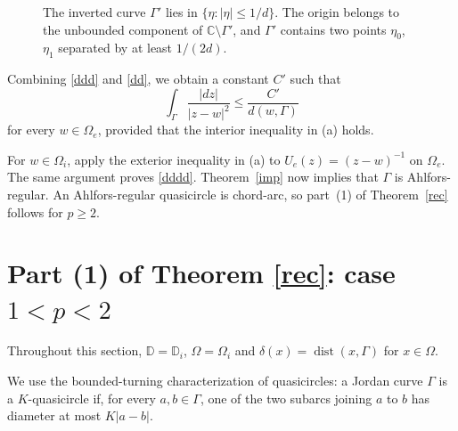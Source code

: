 \documentclass[11pt]{article}
\numberwithin{equation}{section}
\theoremstyle{remark}
\newcommand{\dist}{\operatorname{dist}}
\begin{document}
\begin{figure}[htp]

\caption{
The inverted curve $\Gamma'$ lies in
$\{\eta:|\eta|\le 1/d\}$.
The origin belongs to the unbounded component of
$\mathbb C\setminus\Gamma'$, and $\Gamma'$ contains two points $\eta_0$, $\eta_1$
separated by at least $1/(2d)$.
}
\label{fig:inversion}
\end{figure}
Combining \eqref{ddd} and \eqref{dd}, we obtain a constant $C'$ such
that
\begin{equation}\label{dddd}
    \int_{\Gamma}\frac{|dz|}{|z - w|^2} \leq \frac{C'}{d(w, \Gamma)}
\end{equation}
for every $w\in\Omega_e$, provided that the interior inequality in
\rm(a) holds.

For $w\in\Omega_i$, apply the exterior inequality in \rm(a) to
$U_e(z)=(z-w)^{-1}$ on $\Omega_e$.  The same argument proves
\eqref{dddd}.  Theorem~\ref{imp} now implies that $\Gamma$ is Ahlfors-regular.  An Ahlfors-regular quasicircle is chord-arc, so part~\rm(1) of
Theorem~\ref{rec} follows for $p\ge2$.


\section{Part (1) of Theorem \ref{rec}: case
\texorpdfstring{$1<p<2$}{1 < p < 2}}\label{sec:smallp}

Throughout this section, $\mathbb D = \mathbb D_i$, $\Omega=\Omega_i$ and $\delta(x)=\dist(x,\Gamma)$ for $x\in\Omega$.

We  use the bounded-turning characterization of quasicircles: a Jordan curve $\Gamma$ is
a $K$-quasicircle if, for every $a,b\in\Gamma$, one of the two subarcs
joining $a$ to $b$ has diameter at most $K|a-b|$.
\end{document}
